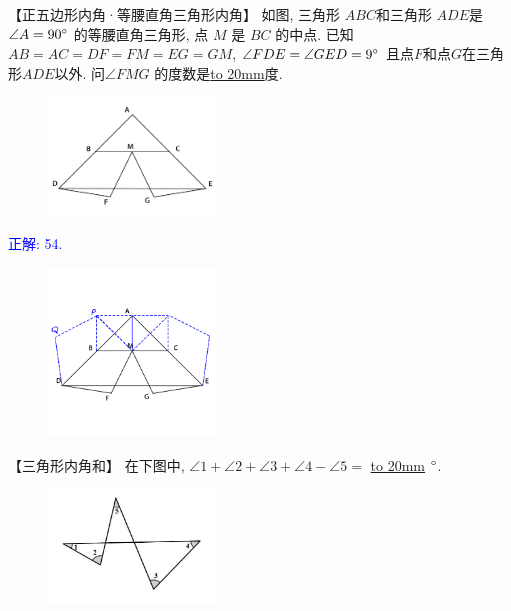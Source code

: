 \item {
    【正五边形内角·等腰直角三角形内角】
    如图, 三角形 $ABC$和三角形 $ADE$是 $\angle A=90\degree$ 的等腰直角三角形, 点 $M$ 是 $BC$ 的中点. 已知$AB=AC=DF=FM=EG=GM$, $\angle FDE = \angle GED=9\degree$ 且点$F$和点$G$在三角形$ADE$以外. 问$\angle FMG$ 的度数是\underline{\hbox to 20mm{}}度. 
    \begin{figure}[H] 
        \centering
        \includegraphics[width=0.4\textwidth]{./pics/Chapter_2/8.png}
    \end{figure}
    \ifshowSolution 
        \fangsong{}\textcolor{blue}{
            正解: 54.\\
            \begin{figure}[H] 
                \centering
                \includegraphics[width=0.4\textwidth]{./pics/Chapter_2/seikai_8.png}
            \end{figure}
        }
    \else
        \vspace{1cm}
    \fi
}

\item {
    【三角形内角和】
    {在下图中, $\angle 1 + \angle 2 + \angle 3 + \angle 4 - \angle 5=$ \underline{\hbox to 20mm{}} $\degree$.} 
    \begin{figure}[H] 
        \centering
        \includegraphics[width=0.4\textwidth]{./pics/Chapter_2/9.png}
    \end{figure}
    \vspace{1cm}
}

